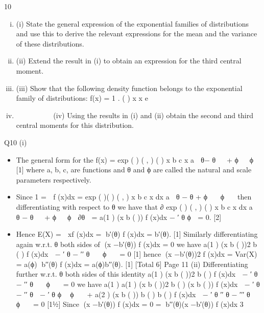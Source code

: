 \documentclass[]{report}
\begin{document}
10 
\begin{enumerate}[(i)]
\item (i) State the general expression of the exponential families of distributions and use this to derive the relevant expressions for the mean and the variance of
these distributions. 
\item (ii) Extend the result in (i) to obtain an expression for the third central moment.
\item (iii) Show that the following density function belongs to the exponential family
of distributions:
f(x) = 1 .
( )
x x e

\item   


  
(iv) Using the results in (i) and (ii) obtain the second and third central moments
for this distribution.
\end{enumerate}

Q10 (i) 
\begin{itemize}
\item The general form for the
f(x) =
  exp ( ) ( , )
( )
x b c x
a
 θ− θ   + ϕ   ϕ 
[1]
where a, b, c, are functions and θ and ϕ are called the natural and scale
parameters respectively.
\item Since
1 =  f (x)dx = exp ( )( ) ( , )
x b c x dx a
 θ − θ + ϕ   ϕ  
then differentiating with respect to θ we have that
∂
exp ( ) ( , )
( )
x b c x dx
a
 θ − θ   + ϕ   ϕ 
∂θ

= a(1 ) (x b ( )) f (x)dx
− ′ θ ϕ  = 0. [2]
\item Hence E(X) =  xf (x)dx = b′(θ) f (x)dx = b′(θ). [1]
Similarly differentiating again w.r.t. θ both sides of (x −b′(θ)) f (x)dx = 0 we
have
a(1 ) (x b ( ))2 b ( ) f (x)dx
 − ′ θ − ′′ θ   ϕ   = 0 [1]
hence
(x −b′(θ))2 f (x)dx = Var(X) = a(ϕ) b′′(θ) f (x)dx = a(ϕ)b′′(θ). [1]
[Total 6]
Page 11
(ii) Differentiating further w.r.t. θ both sides of this identity
a(1 ) (x b ( ))2 b ( ) f (x)dx
 − ′ θ − ′′ θ   ϕ   = 0
we have
a(1 ) a(1 ) (x b ( ))2 b ( ) (x b ( )) f (x)dx
 − ′ θ − ′′ θ  − ′ θ ϕ  ϕ  
+ a(2 ) (x b ( )) b ( ) b ( ) f (x)dx
 − ′ θ ′′ θ − ′′′ θ   ϕ   = 0 [1½]
Since
(x −b′(θ)) f (x)dx = 0 = b′′(θ)(x −b′(θ)) f (x)dx
3
\end{itemize}
\end{document}

